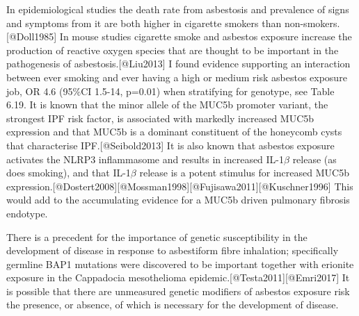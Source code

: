 In epidemiological studies the death rate from asbestosis and prevalence
of signs and symptoms from it are both higher in cigarette smokers than
non-smokers.{[}@Doll1985{]} In mouse studies cigarette smoke and
asbestos exposure increase the production of reactive oxygen species
that are thought to be important in the pathogenesis of
asbestosis.{[}@Liu2013{]} I found evidence supporting an interaction
between ever smoking and ever having a high or medium risk asbestos
exposure job, OR 4.6 (95\%CI 1.5-14, p=0.01) when stratifying for
genotype, see Table 6.19. It is known that the minor allele of the MUC5b
promoter variant, the strongest IPF risk factor, is associated with
markedly increased MUC5b expression and that MUC5b is a dominant
constituent of the honeycomb cysts that characterise
IPF.{[}@Seibold2013{]} It is also known that asbestos exposure activates
the NLRP3 inflammasome and results in increased IL-1\ensuremath{\beta}
release (as does smoking), and that IL-1\ensuremath{\beta} release is a
potent stimulus for increased MUC5b
expression.{[}@Dostert2008{]}{[}@Mossman1998{]}{[}@Fujisawa2011{]}{[}@Kuschner1996{]}
This would add to the accumulating evidence for a MUC5b driven pulmonary
fibrosis endotype.

There is a precedent for the importance of genetic susceptibility in the
development of disease in response to asbestiform fibre inhalation;
specifically germline BAP1 mutations were discovered to be important
together with erionite exposure in the Cappadocia mesothelioma
epidemic.{[}@Testa2011{]}{[}@Emri2017{]} It is possible that there are
unmeasured genetic modifiers of asbestos exposure risk the presence, or
absence, of which is necessary for the development of disease.

